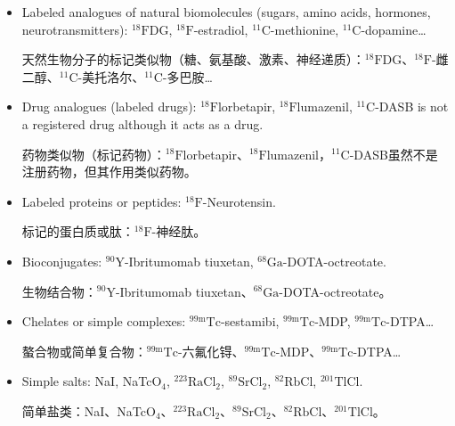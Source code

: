 \documentclass[dvipsnames, svgnames,a4paper,11pt]{article}
\begin{document}
\begin{itemize}

      \item Labeled analogues of natural biomolecules (sugars, amino acids, hormones, neurotransmitters): ${}^\text{18}\text{F}$DG, ${}^\text{18}\text{F}$-estradiol, ${}^\text{11}\text{C}$-methionine, ${}^\text{11}\text{C}$-dopamine…

            天然生物分子的标记类似物（糖、氨基酸、激素、神经递质）：${}^\text{18}\text{F}$DG、${}^\text{18}\text{F}$-雌二醇、${}^\text{11}\text{C}$-美托洛尔、${}^\text{11}\text{C}$-多巴胺…

      \item Drug analogues (labeled drugs): ${}^\text{18}\text{F}$lorbetapir, ${}^\text{18}\text{F}$lumazenil, ${}^\text{11}\text{C}$-DASB is not a registered drug although it acts as a drug.

            药物类似物（标记药物）：${}^\text{18}\text{F}$lorbetapir、${}^\text{18}\text{F}$lumazenil，${}^\text{11}\text{C}$-DASB虽然不是注册药物，但其作用类似药物。

      \item Labeled proteins or peptides: ${}^\text{18}\text{F}$-Neurotensin.

            标记的蛋白质或肽：${}^\text{18}\text{F}$-神经肽。

      \item Bioconjugates: ${}^\text{90}\text{Y}$-Ibritumomab tiuxetan, ${}^\text{68}\text{Ga}$-DOTA-octreotate.

            生物结合物：${}^\text{90}\text{Y}$-Ibritumomab tiuxetan、${}^\text{68}\text{Ga}$-DOTA-octreotate。

      \item Chelates or simple complexes: ${}^\text{99m}\text{Tc}$-sestamibi, ${}^\text{99m}\text{Tc}$-MDP, ${}^\text{99m}\text{Tc}$-DTPA…

            螯合物或简单复合物：${}^\text{99m}\text{Tc}$-六氟化锝、${}^\text{99m}\text{Tc}$-MDP、${}^\text{99m}\text{Tc}$-DTPA…

      \item Simple salts: NaI, NaTcO\(_4\), ${}^\text{223}\text{RaCl}_2$, ${}^\text{89}\text{SrCl}_2$, ${}^\text{82}\text{RbCl}$, ${}^\text{201}\text{TlCl}$.

            简单盐类：NaI、NaTcO\(_4\)、${}^\text{223}\text{RaCl}_2$、${}^\text{89}\text{SrCl}_2$、${}^\text{82}\text{RbCl}$、${}^\text{201}\text{TlCl}$。

\end{itemize}
\end{document}

